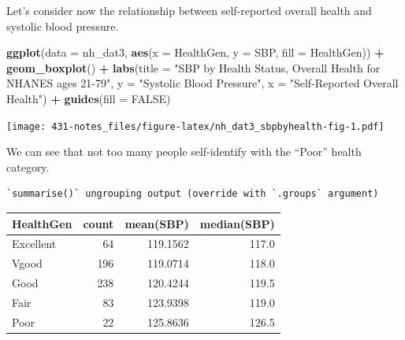 \documentclass[
]{book}
\newenvironment{Shaded}{\begin{snugshade}}{\end{snugshade}}
\newcommand{\DataTypeTok}[1]{\textcolor[rgb]{0.13,0.29,0.53}{#1}}
\newcommand{\KeywordTok}[1]{\textcolor[rgb]{0.13,0.29,0.53}{\textbf{#1}}}
\newcommand{\NormalTok}[1]{#1}
\newcommand{\OperatorTok}[1]{\textcolor[rgb]{0.81,0.36,0.00}{\textbf{#1}}}
\newcommand{\OtherTok}[1]{\textcolor[rgb]{0.56,0.35,0.01}{#1}}
\newcommand{\StringTok}[1]{\textcolor[rgb]{0.31,0.60,0.02}{#1}}
\begin{document}
Let's consider now the relationship between self-reported overall health and systolic blood pressure.

\begin{Shaded}
\begin{Highlighting}[]
\KeywordTok{ggplot}\NormalTok{(}\DataTypeTok{data =}\NormalTok{ nh_dat3, }\KeywordTok{aes}\NormalTok{(}\DataTypeTok{x =}\NormalTok{ HealthGen, }\DataTypeTok{y =}\NormalTok{ SBP, }\DataTypeTok{fill =}\NormalTok{ HealthGen)) }\OperatorTok{+}\StringTok{ }
\StringTok{    }\KeywordTok{geom_boxplot}\NormalTok{() }\OperatorTok{+}\StringTok{ }
\StringTok{    }\KeywordTok{labs}\NormalTok{(}\DataTypeTok{title =} \StringTok{"SBP by Health Status, Overall Health for NHANES ages 21-79"}\NormalTok{,}
         \DataTypeTok{y =} \StringTok{"Systolic Blood Pressure"}\NormalTok{, }\DataTypeTok{x =} \StringTok{"Self-Reported Overall Health"}\NormalTok{) }\OperatorTok{+}\StringTok{ }
\StringTok{    }\KeywordTok{guides}\NormalTok{(}\DataTypeTok{fill =} \OtherTok{FALSE}\NormalTok{) }
\end{Highlighting}
\end{Shaded}

\texttt{[image: 431-notes\_files/figure-latex/nh\_dat3\_sbpbyhealth-fig-1.pdf]}

We can see that not too many people self-identify with the ``Poor'' health category.

\begin{Shaded}
\end{Shaded}

\begin{verbatim}
`summarise()` ungrouping output (override with `.groups` argument)
\end{verbatim}

\begin{tabular}{l|r|r|r}
\hline
HealthGen & count & mean(SBP) & median(SBP)\\
\hline
Excellent & 64 & 119.1562 & 117.0\\
\hline
Vgood & 196 & 119.0714 & 118.0\\
\hline
Good & 238 & 120.4244 & 119.5\\
\hline
Fair & 83 & 123.9398 & 119.0\\
\hline
Poor & 22 & 125.8636 & 126.5\\
\hline
\end{tabular}
\end{document}
